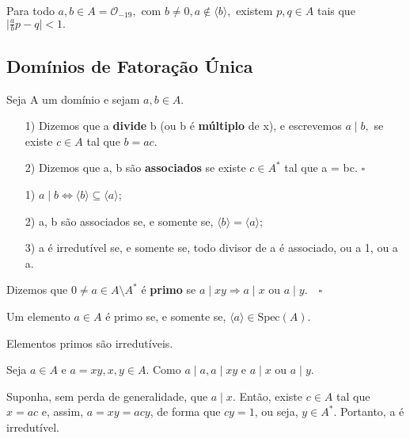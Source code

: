 \documentclass[algebraII_notes.tex]{subfiles}
\begin{document}
\begin{lemma*}
	Para todo \(a, b\in A = \mathcal{O}_{-19},\) com \(b\neq0, a\not\in \langle b \rangle,\) existem \(p, q\in A\) tais que
	\(\biggl|\frac{a}{b}p - q\biggr| < 1.\)
\end{lemma*}
\subsection{Domínios de Fatoração Única}
\begin{def*}
	Seja A um domínio e sejam \(a, b\in A\).
	\begin{itemize}
		\item[1)] Dizemos que a \textbf{divide} b (ou b é \textbf{múltiplo} de x), e escrevemos \(a\mid b,\) se existe \(c\in A\) tal que \(b = ac.\)
		\item[2)] Dizemos que a, b são \textbf{associados} se existe \(c\in A^{*}\) tal que a = bc. \(\square\)
	\end{itemize}
\end{def*}
\begin{prop*}[Exercício]
	\begin{itemize}
		\item[1)] \(a\mid b \Longleftrightarrow \langle b \rangle \subseteq{\langle a \rangle}\);
		\item[2)] a, b são associados se, e somente se, \(\langle b \rangle = \langle a \rangle\);
		\item[3)] a é irredutível se, e somente se, todo divisor de a é associado, ou a 1, ou a a.
	\end{itemize}
\end{prop*}
\begin{def*}
	Dizemos que \(0\neq a\in A\setminus{A^{*}}\) é \textbf{primo} se \(a\mid xy \Rightarrow a\mid x\) ou \(a\mid y.\quad\square\)
\end{def*}
\begin{prop*}[Exercício]
	Um elemento \(a\in A\) é primo se, e somente se, \(\langle a \rangle\in \mathrm{Spec}(A).\)
\end{prop*}
\begin{lemma*}
	Elementos primos são irredutíveis.
\end{lemma*}
\begin{proof*}
	Seja \(a\in A\) e \(a = xy, x, y\in A.\) Como \(a\mid a, a\mid xy\) e \(a\mid x\) ou \(a\mid y\).

	Suponha, sem perda de generalidade, que \(a\mid x\). Então, existe \(c\in A\) tal que \(x=ac\) e, assim, \(a=xy=acy\), de forma que \(cy = 1\), ou seja,
	\(y\in A^{*}.\) Portanto, a é irredutível. \qedsymbol
\end{proof*}
\end{document}
